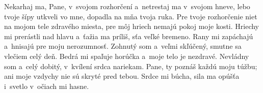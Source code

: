Nekarhaj ma, Pane, v~svojom rozhorčení
a~netrestaj ma v~svojom hneve,
\versseparator
lebo tvoje šípy utkveli vo mne,
dopadla na mňa tvoja ruka.
\versseparator
Pre tvoje rozhorčenie niet na mojom tele zdravého miesta,
pre môj hriech nemajú pokoj moje kosti.
\versseparator
Hriechy mi prerástli nad hlavu
a~ťažia ma príliš, sťa veľké bremeno.
\versseparator
Rany mi zapáchajú a~hnisajú
pre moju nerozumnosť.
\versseparator
Zohnutý som a~veľmi skľúčený,
smutne sa vlečiem celý deň.
\versseparator
Bedrá mi spaľuje horúčka
a~moje telo je nezdravé.
\versseparator
Nevládny som a~celý dobitý,
v~kvílení srdca nariekam.
\versseparator
Pane, ty poznáš každú moju túžbu;
ani moje vzdychy nie sú skryté pred tebou.
\versseparator
Srdce mi búcha, sila ma opúšťa
 i~svetlo v~očiach mi hasne.
